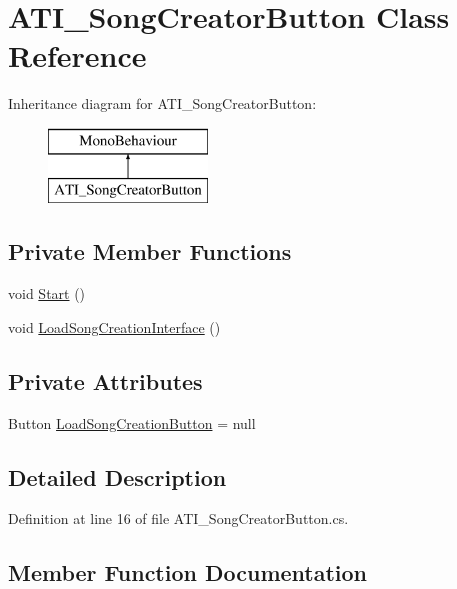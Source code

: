 \hypertarget{class_a_t_i___song_creator_button}{}\section{A\+T\+I\+\_\+\+Song\+Creator\+Button Class Reference}
\label{class_a_t_i___song_creator_button}
Inheritance diagram for A\+T\+I\+\_\+\+Song\+Creator\+Button\+:\begin{figure}[H]
\begin{center}
\leavevmode
\includegraphics[height=2.000000cm]{class_a_t_i___song_creator_button}
\end{center}
\end{figure}
\subsection*{Private Member Functions}
\begin{DoxyCompactItemize}
\item 
void \hyperlink{class_a_t_i___song_creator_button_a70e91a092e195182c79f0111dd118f2a}{Start} ()
\item 
void \hyperlink{class_a_t_i___song_creator_button_a6c024ae05ba70e847779b7a194611eb5}{Load\+Song\+Creation\+Interface} ()
\end{DoxyCompactItemize}
\subsection*{Private Attributes}
\begin{DoxyCompactItemize}
\item 
Button \hyperlink{class_a_t_i___song_creator_button_af47eac9d1ed3a74d49a511fdbd57ff3e}{Load\+Song\+Creation\+Button} = null
\end{DoxyCompactItemize}


\subsection{Detailed Description}


Definition at line 16 of file A\+T\+I\+\_\+\+Song\+Creator\+Button.\+cs.



\subsection{Member Function Documentation}
\mbox{\label{class_a_t_i___song_creator_button_a6c024ae05ba70e847779b7a194611eb5}} 
